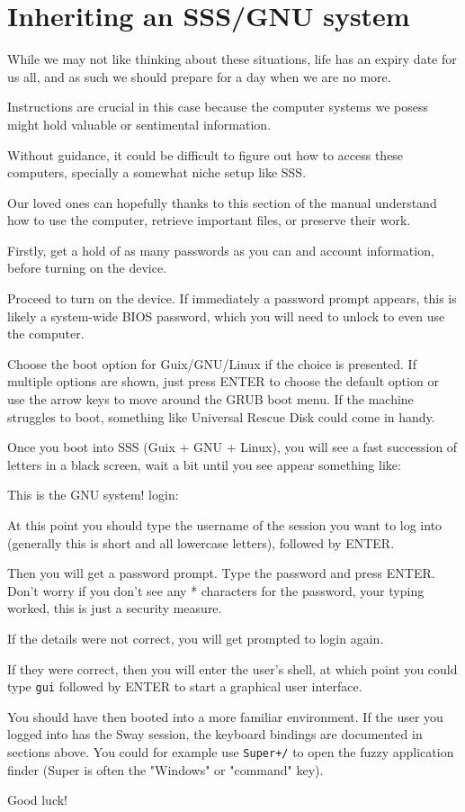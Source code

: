 \documentclass[11pt]{article}
\begin{document}
\section{Inheriting an SSS/GNU system}
\label{sec:org947a456}

While we may not like thinking about these situations, life has an expiry date for us all, and as such we should prepare for a day when we are no more.


Instructions are crucial in this case because the computer systems we posess might hold valuable or sentimental information.

Without guidance, it could be difficult to figure out how to access these computers, specially a somewhat niche setup like SSS.

Our loved ones can hopefully thanks to this section of the manual understand how to use the computer, retrieve important files, or preserve their work.

Firstly, get a hold of as many passwords as you can and account information, before turning on the device.

Proceed to turn on the device. If immediately a password prompt appears, this is likely a system-wide BIOS password, which you will need to unlock to even use the computer.

Choose the boot option for Guix/GNU/Linux if the choice is presented. If multiple options are shown, just press ENTER to choose the default option or use the arrow keys to move around the GRUB boot menu. If the machine struggles to boot, something like Universal Rescue Disk could come in handy.

Once you boot into SSS (Guix + GNU + Linux), you will see a fast succession of letters in a black screen, wait a bit until you see appear something like:

This is the GNU system!
login:

At this point you should type the username of the session you want to log into (generally this is short and all lowercase letters), followed by ENTER.

Then you will get a password prompt. Type the password and press ENTER. Don't worry if you don't see any * characters for the password, your typing worked, this is just a security measure.

If the details were not correct, you will get prompted to login again.

If they were correct, then you will enter the user's shell, at which point you could type \texttt{gui} followed by ENTER to start a graphical user interface.

You should have then booted into a more familiar environment. If the user you logged into has the Sway session, the keyboard bindings are documented in sections above. You could for example use \texttt{Super+/} to open the fuzzy application finder (Super is often the "Windows" or "command" key).

Good luck!
\end{document}

